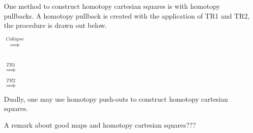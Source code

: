     \begin{remark}
        One method to construct homotopy cartesian squares is with homotopy pullbacks. A homotopy pullback is created with the application of TR1 and TR2, the procedure is drawn out below.
        \begin{center}
            $\stackrel{Collapse}{\implies}$
             \\
            $\stackrel{TR1}{\implies}$
            $\stackrel{TR2}{\implies}$
        \end{center}

        Dually, one may use homotopy push-outs to construct homotopy cartesian squares.
    \end{remark}

    \begin{remark}
        A remark about good maps and homotopy cartesian squares???
    \end{remark}

